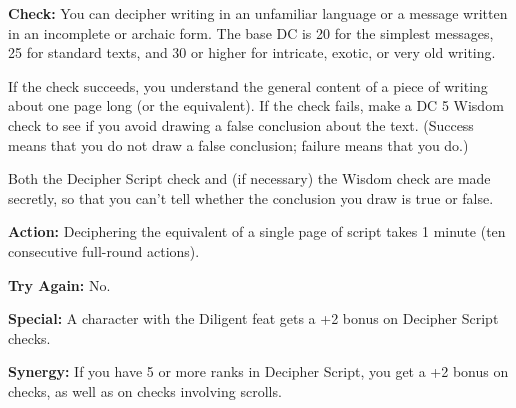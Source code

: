\textbf{Check:} You can decipher writing in an unfamiliar language or a message written in an incomplete or archaic form. The base DC is 20 for the simplest messages, 25 for standard texts, and 30 or higher for intricate, exotic, or very old writing.

If the check succeeds, you understand the general content of a piece of writing about one page long (or the equivalent). If the check fails, make a DC 5 Wisdom check to see if you avoid drawing a false conclusion about the text. (Success means that you do not draw a false conclusion; failure means that you do.)

Both the Decipher Script check and (if necessary) the Wisdom check are made secretly, so that you can't tell whether the conclusion you draw is true or false.

\textbf{Action:} Deciphering the equivalent of a single page of script takes 1 minute (ten consecutive full-round actions).

\textbf{Try Again:} No.

\textbf{Special:} A character with the Diligent feat gets a +2 bonus on Decipher Script checks.

\textbf{Synergy:} If you have 5 or more ranks in Decipher Script, you get a +2 bonus on  checks, as well as on  checks involving scrolls.
